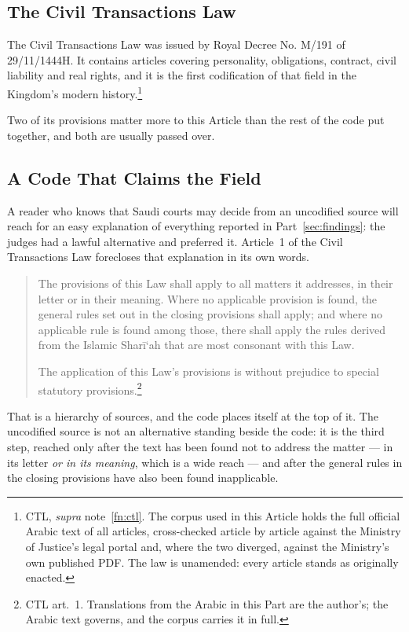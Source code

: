 \documentclass[12pt]{article}
\begin{document}
\subsection{The Civil Transactions Law}

The Civil Transactions Law was issued by Royal Decree No. M/191 of
29/11/1444H. It contains \nCivilArticles{} articles covering personality,
obligations, contract, civil liability and real rights, and it is the first
codification of that field in the Kingdom's modern history.\footnote{CTL,
\emph{supra} note~\ref{fn:ctl}. The corpus used in this Article holds the full
official Arabic text of all \nCivilArticles{} articles, cross-checked article
by article against the Ministry of Justice's legal portal and, where the two
diverged, against the Ministry's own published PDF. The law is unamended:
every article stands as originally enacted.}

Two of its provisions matter more to this Article than the rest of the code
put together, and both are usually passed over.

\subsection{A Code That Claims the Field}
\label{sec:article-one}

A reader who knows that Saudi courts may decide from an uncodified source will
reach for an easy explanation of everything reported in Part~\ref{sec:findings}: the judges had
a lawful alternative and preferred it. Article~1 of the Civil Transactions Law
forecloses that explanation in its own words.

\begin{quote}
\singlespacing\small
The provisions of this Law shall apply to all matters it addresses, in their
letter or in their meaning. Where no applicable provision is found, the
general rules set out in the closing provisions shall apply; and where no
applicable rule is found among those, there shall apply the rules derived from
the Islamic Shar\=i`ah that are most consonant with this Law.

The application of this Law's provisions is without prejudice to special
statutory provisions.\footnote{CTL art.~1. Translations from the Arabic in
this Part are the author's; the Arabic text governs, and the corpus carries it
in full.}
\end{quote}

That is a hierarchy of sources, and the code places itself at the top of it.
The uncodified source is not an alternative standing beside the code: it is
the third step, reached only after the text has been found not to address the
matter --- in its letter \emph{or in its meaning}, which is a wide reach ---
and after the general rules in the closing provisions have also been found
inapplicable.
\end{document}
